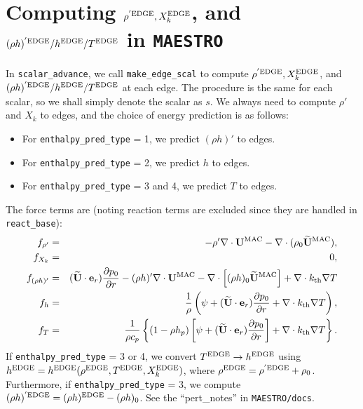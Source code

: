 \section{Computing $\rho^{'\rm EDGE}, X_k^{\rm EDGE}$, and $(\rho h)^{'\rm EDGE}/h^{\rm EDGE}/T^{\rm EDGE}$ in {\tt MAESTRO}}
In {\tt scalar\_advance}, we call {\tt make\_edge\_scal} to compute
$\rho^{'\rm EDGE}, X_k^{\rm EDGE}$, and $(\rho
h)^{'\rm EDGE}/h^{\rm EDGE}/T^{\rm EDGE}$ at each edge.  The procedure is the
same for each scalar, so we shall simply denote the scalar as $s$.  We
always need to compute $\rho'$ and $X_k$ to edges, and the choice of
energy prediction is as follows:
\begin{itemize}
\item For {\tt enthalpy\_pred\_type} = 1, we predict $(\rho h)'$ to edges.
\item For {\tt enthalpy\_pred\_type} = 2, we predict $h$ to edges.
\item For {\tt enthalpy\_pred\_type} = 3 and 4, we predict $T$ to edges.
\end{itemize}
The force terms are (noting reaction terms are excluded since they are
handled in {\tt react\_base}):
\begin{eqnarray}
f_{\rho'} &=& -\rho'\nabla\cdot{\bf U}^{\rm MAC} - \nabla\cdot(\rho_0\widetilde{{\bf U}}^{\rm MAC}), \\
f_{X_k} &=& 0, \\
f_{(\rho h)'} &=& (\widetilde{{\bf U}}\cdot{\bf e}_r)\frac{\partial p_0}{\partial r} -(\rho h)'\nabla\cdot{\bf U}^{\rm MAC} - \nabla\cdot\left[(\rho h)_0\widetilde{{\bf U}}^{\rm MAC}\right] + \nabla\cdot k_{\rm th}\nabla T \\
f_h &=& \frac{1}{\rho}\left(\psi + (\widetilde{{\bf U}}\cdot{\bf e}_r)\frac{\partial p_0}{\partial r} + \nabla\cdot k_{\rm th}\nabla T \right), \\
f_T &=& \frac{1}{\rho c_p}\left\{(1-\rho h_p)\left[\psi + (\widetilde{{\bf U}}\cdot{\bf e}_r)\frac{\partial p_0}{\partial r}\right] + \nabla\cdot k_{\rm th}\nabla T \right\}.
\end{eqnarray}
If {\tt enthalpy\_pred\_type} = 3 or 4, we convert
$T^{\rm EDGE}\rightarrow h^{\rm EDGE}$ using $h^{\rm EDGE} =
h^{\rm EDGE}(\rho^{\rm EDGE},T^{\rm EDGE},X_k^{\rm EDGE})$, where $\rho^{\rm EDGE} =
\rho^{'\rm EDGE} + \rho_0$.  Furthermore, if {\tt enthalpy\_pred\_type} =
3, we compute $(\rho h)^{'\rm EDGE} = (\rho h)^{\rm EDGE} - (\rho h)_0$.
See the ``pert\_notes'' in {\tt MAESTRO/docs}.


